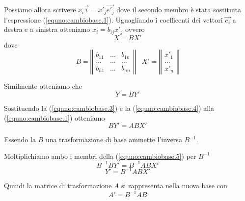 Possiamo allora scrivere $x_i\vec{i}=x'_j\vec{e'_j}$ dove il secondo membro
\`e stata sostituita l'espressione (\ref{equno:cambiobase.1}).
Uguagliando i coefficenti dei vettori $\vec{e_i}$ a destra e a sinistra
otteniamo $x_i=b_{ij}x'_j$ ovvero
\begin{equation}
  X=BX'
  \label{equno:cambiobase.3}
\end{equation}
dove
\begin{displaymath}
  B=
  \left\Vert
  \begin{array}{lll}
    b_{11}&\dots&b_{1n}\\
    \dots&\dots&\dots\\
    b_{n1}&\dots&b_{nn}
  \end{array}
  \right\Vert
  \;\;\;
  X'=
  \left\Vert
  \begin{array}{l}
    x'_1\\ \dots\\x'_n
  \end{array}
  \right\Vert
\end{displaymath}

Similmente otteniamo che
\begin{equation}
  Y=BY'
  \label{equno:cambiobase.4}
\end{equation}

Sostituendo la (\ref{equno:cambiobase.3}) e la (\ref{equno:cambiobase.4}) alla (\ref{equno:cambiobase.1})
otteniamo
\begin{equation}
  BY'=ABX'
  \label{equno:cambiobase.5}
\end{equation}

Essendo la $B$ una trasformazione di base ammette l'inversa $B^{-1}$.

Moltiplichiamo ambo i membri della (\ref{equno:cambiobase.5}) per  $B^{-1}$
\begin{displaymath}
  B^{-1}BY'=B^{-1}ABX'
\end{displaymath}
\begin{displaymath}
  Y'=B^{-1}ABX'
\end{displaymath}

Quindi la matrice di trasformazione $A$ si rappresenta nella nuova base con
\begin{equation}
  A'=B^{-1}AB
\end{equation}
